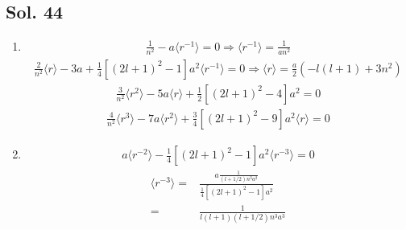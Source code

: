 \subsection*{Sol. 44}
\begin{enumerate}
    \item 
    \begin{align*}
        \frac{1}{n^2} - a\langle r^{-1}\rangle = 0\Rightarrow\langle r^{-1}\rangle = \frac{1}{an^2}
    \end{align*}
    \begin{align*}
        \frac{2}{n^2}\langle r\rangle
        -3a + \frac{1}{4}[(2l+1)^2-1]a^2\langle r^{-1}\rangle=0
        \Rightarrow \langle r\rangle=  
        \frac{a}{2}\left(-l(l+1) + 3n^2\right)
    \end{align*}
    \begin{align*}
        \frac{3}{n^2}\langle r^2\rangle-5a\langle r\rangle
        +\frac{1}{2}[(2l+1)^2-4]a^2=0
    \end{align*}
    \begin{align*}
        \frac{4}{n^2}\langle r^3\rangle-7a\langle r^2\rangle
        +\frac{3}{4}[(2l+1)^2-9]a^2\langle r\rangle=0
    \end{align*}
    \item 
    \begin{align*}
        a\langle r^{-2}\rangle
        -\frac{1}{4}[(2l+1)^2-1]a^2\langle r^{-3}\rangle=0
    \end{align*}
    \begin{align*}
        \langle r^{-3}\rangle =& \frac{a\frac{1}{(l+1/2)n^3a^2}}{\frac{1}{4}[(2l+1)^2-1]a^2}\\
        =&\frac{1}{l(l+1)(l+1/2)n^3a^3}
    \end{align*}
\end{enumerate}

